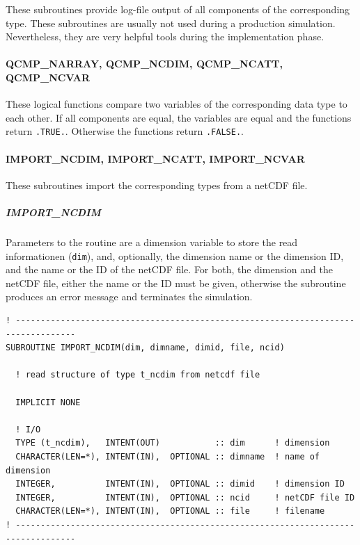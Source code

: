 \documentclass[11pt,twoside]{article}
\begin{document}
These subroutines provide log-file output of all components of the corresponding
type. These subroutines are usually not used during a production simulation.
Nevertheless, they are very helpful tools during the implementation phase.

\paragraph{QCMP\_NARRAY, QCMP\_NCDIM, QCMP\_NCATT, QCMP\_NCVAR\\\label{QCMPNC}}

These logical functions compare two variables of the corresponding data type to 
each other. If all components are equal, the variables are equal and the 
functions return \verb|.TRUE.|. Otherwise the functions
return \verb|.FALSE.|.

\paragraph{IMPORT\_NCDIM, IMPORT\_NCATT, IMPORT\_NCVAR\\\label{IMPORTNC}}

These subroutines import the corresponding types from a netCDF file.
\subparagraph{IMPORT\_NCDIM\\\label{IMPNCDIM}}

Parameters to the routine are a dimension variable to store the read
informationen (\verb|dim|), 
and, optionally, the dimension name or the dimension ID, and the name or the ID
of the netCDF file. For both, the dimension and the netCDF file, either
the name or the ID  must be given, otherwise the subroutine produces
an error message and terminates the simulation.

\begin{verbatim}
! ----------------------------------------------------------------------------------
SUBROUTINE IMPORT_NCDIM(dim, dimname, dimid, file, ncid)

  ! read structure of type t_ncdim from netcdf file

  IMPLICIT NONE

  ! I/O
  TYPE (t_ncdim),   INTENT(OUT)           :: dim      ! dimension
  CHARACTER(LEN=*), INTENT(IN),  OPTIONAL :: dimname  ! name of dimension
  INTEGER,          INTENT(IN),  OPTIONAL :: dimid    ! dimension ID
  INTEGER,          INTENT(IN),  OPTIONAL :: ncid     ! netCDF file ID
  CHARACTER(LEN=*), INTENT(IN),  OPTIONAL :: file     ! filename
! ----------------------------------------------------------------------------------
\end{verbatim}
\end{document}
